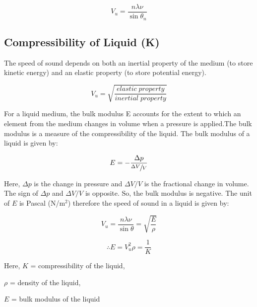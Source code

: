 
	\begin{equation}
		V_u = \frac{n\lambda\nu}{\sin\theta_n}
	\end{equation}\label{eqn:1}


	\subsection{Compressibility of Liquid (K)}

	The speed of sound depends on both an inertial property of the medium (to store kinetic energy) and an elastic property (to store potential energy).

	$$V_u = \sqrt{\frac{elastic\;property}{inertial\;property}}$$

	For a liquid medium, the bulk modulus E accounts for the extent to which an element from the medium changes in volume when a pressure is applied.The bulk modulus is a measure of the compressibility of the liquid. The bulk modulus of a liquid is given by:

	$$E = -\frac{\Delta p}{\sfrac{\Delta V}{V}}$$

	Here, $\Delta p$ is the change in pressure and $\Delta V/V$ is the fractional change in volume. The sign of $\Delta p$ and $\Delta V/V$ is opposite. So, the bulk modulus is negative. The unit of $E$ is Pascal (N/m$^2$) therefore the speed of sound in a liquid is given by:

	$$V_u = \frac{n\lambda\nu}{\sin\theta} = \sqrt{\frac{E}{\rho}}$$

	\begin{equation}
		\therefore E = V_u^2\rho = \frac{1}{K}
	\end{equation}\label{eqn:2}

	\noindent Here, $K$ = compressibility of the liquid,

	\hspace{4mm} $\rho$ = density of the liquid,

	\hspace{4mm} $E$ = bulk modulus of the liquid

